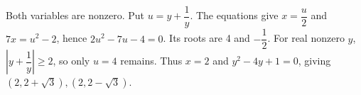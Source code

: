 Both variables are nonzero. Put $u=y+\dfrac{1}{y}$. The equations give $x=\dfrac{u}{2}$ and $7x=u^2-2$, hence $2u^2-7u-4=0$. Its roots are 4 and $-\dfrac{1}{2}$. For real nonzero $y$, $|y+\dfrac{1}{y}|\ge2$, so only $u=4$ remains. Thus $x=2$ and $y^2-4y+1=0$, giving $\boxed{(2,2+\sqrt3),(2,2-\sqrt3)}$.
